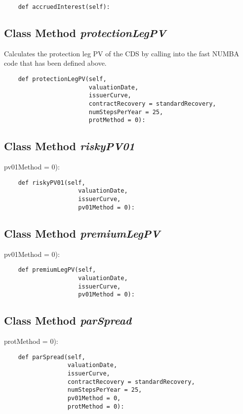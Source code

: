 \documentclass[twoside,11pt]{book}
\begin{document}
\begin{lstlisting}
    def accruedInterest(self):
\end{lstlisting}

\subsection{Class Method {\it protectionLegPV}}
Calculates the protection leg PV of the CDS by calling into the fast NUMBA code that has been defined above. 

\begin{lstlisting}
    def protectionLegPV(self,
                        valuationDate,
                        issuerCurve,
                        contractRecovery = standardRecovery,
                        numStepsPerYear = 25,
                        protMethod = 0):
\end{lstlisting}

\subsection{Class Method {\it riskyPV01}}
pv01Method = 0):

\begin{lstlisting}
    def riskyPV01(self,
                     valuationDate,
                     issuerCurve,
                     pv01Method = 0):
\end{lstlisting}

\subsection{Class Method {\it premiumLegPV}}
pv01Method = 0):

\begin{lstlisting}
    def premiumLegPV(self,
                     valuationDate,
                     issuerCurve,
                     pv01Method = 0):
\end{lstlisting}

\subsection{Class Method {\it parSpread}}
protMethod = 0):

\begin{lstlisting}
    def parSpread(self,
                  valuationDate,
                  issuerCurve,
                  contractRecovery = standardRecovery,
                  numStepsPerYear = 25,
                  pv01Method = 0,
                  protMethod = 0):
\end{lstlisting}
\end{document}
